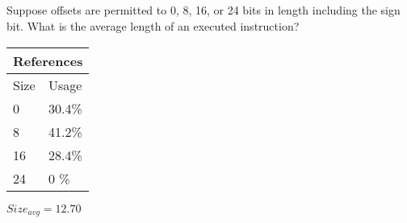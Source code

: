 \documentclass{article}
\begin{document}
\subsection{}
Suppose offsets are permitted to 0, 8, 16, or 24 bits in length including the sign bit. What is the average length of an executed instruction? \\

\begin{multicols}{3}
\begin{minipage}{\linewidth}
\begin{tabular}{|l|l|}
\hline
\multicolumn{2}{|l|}{References}\\
\hline
Size & Usage \\
\hline
0 & 30.4\%\\
8 & 41.2\%\\
16 & 28.4\%\\
24 & 0 \%\\
\hline
\end{tabular}\par
\bigskip
$Size_{avg}=12.70$\\


\end{minipage}
\end{multicols}
\end{document}
